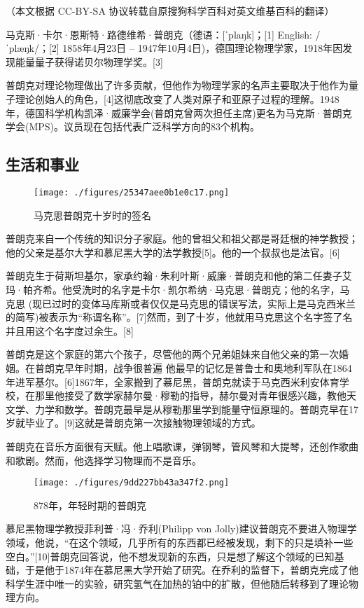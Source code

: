 
（本文根据 CC-BY-SA 协议转载自原搜狗科学百科对英文维基百科的翻译）

马克斯·卡尔·恩斯特·路德维希·普朗克（德语：[ˈplaŋk]；[1] English: /ˈplæŋk/；[2] 1858年4月23日 – 1947年10月4日)，德国理论物理学家，1918年因发现能量量子获得诺贝尔物理学奖。[3]

普朗克对理论物理做出了许多贡献，但他作为物理学家的名声主要取决于他作为量子理论创始人的角色，[4]这彻底改变了人类对原子和亚原子过程的理解。1948年，德国科学机构凯泽·威廉学会(普朗克曾两次担任主席)更名为马克斯·普朗克学会(MPS)。议员现在包括代表广泛科学方向的83个机构。

\subsection{生活和事业}
\begin{figure}[ht]
\centering
\texttt{[image: ./figures/25347aee0b1e0c17.png]}
\caption{马克思普朗克十岁时的签名} \label{fig_Max_1}
\end{figure}
普朗克来自一个传统的知识分子家庭。他的曾祖父和祖父都是哥廷根的神学教授；他的父亲是基尔大学和慕尼黑大学的法学教授[5]。他的一个叔叔也是法官。[6]

普朗克生于荷斯坦基尔，家承约翰·朱利叶斯·威廉·普朗克和他的第二任妻子艾玛·帕齐希。他受洗时的名字是卡尔·凯尔希纳·马克思·普朗克；他的名字，马克思 (现已过时的变体马库斯或者仅仅是马克思的错误写法，实际上是马克西米兰的简写)被表示为“称谓名称”。[7]然而，到了十岁，他就用马克思这个名字签了名并且用这个名字度过余生。[8]

普朗克是这个家庭的第六个孩子，尽管他的两个兄弟姐妹来自他父亲的第一次婚姻。在普朗克早年时期，战争很普遍 他最早的记忆是普鲁士和奥地利军队在1864年进军基尔。[6]1867年，全家搬到了慕尼黑，普朗克就读于马克西米利安体育学校，在那里他接受了数学家赫尔曼·穆勒的指导，赫尔曼对青年很感兴趣，教他天文学、力学和数学。普朗克最早是从穆勒那里学到能量守恒原理的。普朗克早在17岁就毕业了。[9]这就是普朗克第一次接触物理领域的方式。

普朗克在音乐方面很有天赋。他上唱歌课，弹钢琴，管风琴和大提琴，还创作歌曲和歌剧。然而，他选择学习物理而不是音乐。
\begin{figure}[ht]
\centering
\texttt{[image: ./figures/9dd227bb43a347f2.png]}
\caption{878年，年轻时期的普朗克} \label{fig_Max_2}
\end{figure}
慕尼黑物理学教授菲利普·冯·乔利(Philipp von Jolly)建议普朗克不要进入物理学领域，他说，“在这个领域，几乎所有的东西都已经被发现，剩下的只是填补一些空白。”[10]普朗克回答说，他不想发现新的东西，只是想了解这个领域的已知基础，于是他于1874年在慕尼黑大学开始了研究。在乔利的监督下，普朗克完成了他科学生涯中唯一的实验，研究氢气在加热的铂中的扩散，但他随后转移到了理论物理方向。

